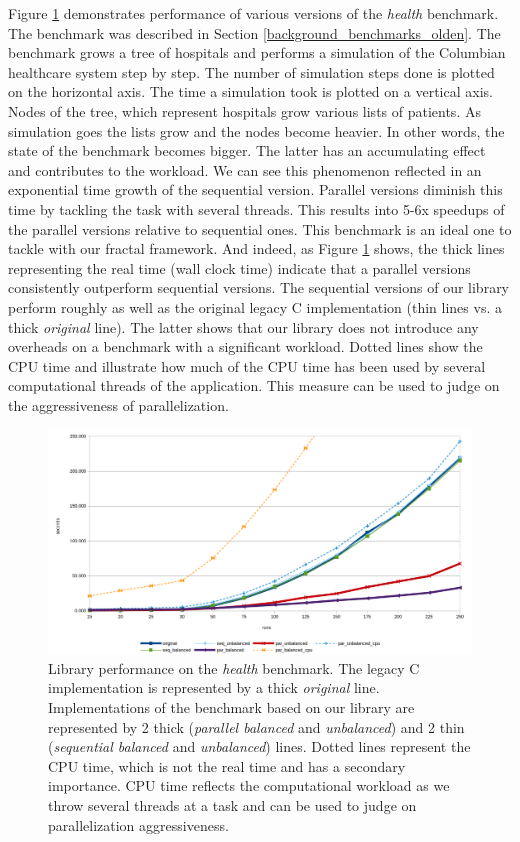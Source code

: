 \quad Figure \ref{fig:performance_health} demonstrates performance of various versions of the \textit{health} benchmark. The benchmark was described in Section \ref{background_benchmarks_olden}. The benchmark grows a tree of hospitals and performs a simulation of the Columbian healthcare system step by step. The number of simulation steps done is plotted on the horizontal axis. The time a simulation took is plotted on a vertical axis. Nodes of the tree, which represent hospitals grow various lists of patients. As simulation goes the lists grow and the nodes become heavier. In other words, the state of the benchmark becomes bigger. The latter has an accumulating effect and contributes to the workload. We can see this phenomenon reflected in an exponential time growth of the sequential version. Parallel versions diminish this time by tackling the task with several threads. This results into 5-6x speedups of the parallel versions relative to sequential ones. This benchmark is an ideal one to tackle with our fractal framework. And indeed, as Figure \ref{fig:performance_health} shows, the thick lines representing the real time (wall clock time) indicate that a parallel versions consistently outperform sequential versions. The sequential versions of our library perform roughly as well as the original legacy C implementation (thin lines vs. a thick \textit{original} line). The latter shows that our library does not introduce any overheads on a benchmark with a significant workload. Dotted lines show the CPU time and illustrate how much of the CPU time has been used by several computational threads of the application. This measure can be used to judge on the aggressiveness of parallelization. 
\begin{figure}[!htb]
\includegraphics[width=1.0\textwidth]{images/health_depth_10.png}
\caption{Library performance on the \textit{health} benchmark. The legacy C implementation is represented by a thick \textit{original} line. Implementations of the benchmark based on our library are represented by 2 thick (\textit{parallel balanced} and \textit{unbalanced}) and 2 thin (\textit{sequential balanced} and \textit{unbalanced}) lines. Dotted lines represent the CPU time, which is not the real time and has a secondary importance. CPU time reflects the computational workload as we throw several threads at a task and can be used to judge on parallelization aggressiveness.}
\label{fig:performance_health}
\end{figure}\newline\null
